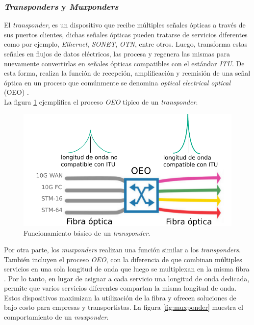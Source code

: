 \subsubsection{\textit{Transponders} y \textit{Muxponders}}
El \textit{transponder}, es un dispositivo que recibe múltiples señales ópticas a través de sus puertos clientes, dichas señales ópticas pueden tratarse de servicios diferentes como por ejemplo, \textit{Ethernet}, \textit{SONET}, \textit{OTN}, entre otros. Luego, transforma estas señales en flujos de datos eléctricos, las procesa y regenera las mismas para nuevamente convertirlas en señales ópticas compatibles con el estándar \textit{ITU}. De esta forma, realiza la función de recepción, amplificación y reemisión de una señal óptica en un proceso que comúnmente se denomina \textit{optical electrical optical} (OEO) \parencite{transpondermux}.
\\

La figura \ref{fig:transponder} ejemplifica el proceso \textit{OEO} típico de un \textit{transponder}.

\begin{figure}[H]
	\centering
	\includegraphics[scale=0.9]{Figures/transponder.pdf}
	\caption{Funcionamiento básico de un \textit{transponder}.}
	\label{fig:transponder}
  \end{figure}

  Por otra parte, los \textit{muxponders} realizan una función similar a los \textit{transponders}. También incluyen el proceso \textit{OEO}, con la diferencia de que combinan múltiples servicios en una sola longitud de onda que luego se multiplexan en la misma fibra \parencite{transpondermux}. Por lo tanto, en lugar de asignar a cada servicio una longitud de onda dedicada, permite que varios servicios diferentes compartan la misma longitud de onda. Estos dispositivos maximizan la utilización de la fibra y ofrecen soluciones de bajo costo para empresas y transportistas. La figura \ref{fig:muxponder} muestra el comportamiento de un \textit{muxponder}.

